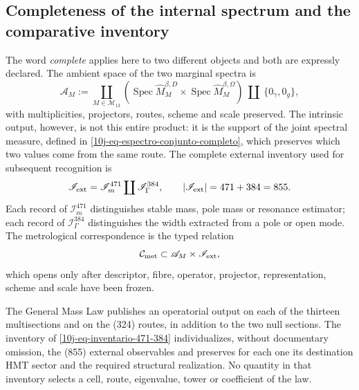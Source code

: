 \subsection{Completeness of the internal spectrum and the comparative inventory}

The word \emph{complete} applies here to two different objects and both are expressly declared. The ambient space of the two marginal spectra is
\begin{equation}
 \mathscr A_M:=
 \coprod_{M\in\mathcal M_{13}}
 \left(
  \operatorname{Spec}\widehat M_M^{\beta,D}
  \times
  \operatorname{Spec}\widehat M_M^{\beta,\Omega}
 \right)
 \ \coprod\ \{0_\gamma,0_g\},
 \label{10j-eq-espectro-interno-completo}
\end{equation}
with multiplicities, projectors, routes, scheme and scale preserved. The intrinsic output, however, is not this entire product: it is the support of the joint spectral measure, defined in \eqref{10j-eq-espectro-conjunto-completo}, which preserves which two values come from the same route. The complete external inventory used for subsequent recognition is
\begin{equation}
 \mathscr I_{\rm ext}
 =\mathscr I_m^{471}\coprod\mathscr I_\Gamma^{384},
 \qquad |\mathscr I_{\rm ext}|=471+384=855.
 \label{10j-eq-inventario-471-384}
\end{equation}
Each record of \(\mathscr I_m^{471}\) distinguishes stable mass, pole mass or resonance estimator; each record of \(\mathscr I_\Gamma^{384}\) distinguishes the width extracted from a pole or open mode. The metrological correspondence is the typed relation
\begin{equation}
 \mathcal C_{\rm met}
 \subset
 \mathscr A_M\times\mathscr I_{\rm ext},
 \label{10j-eq-correspondencia-metrologica-completa}
\end{equation}
which opens only after descriptor, fibre, operator, projector, representation, scheme and scale have been frozen.

\begin{theorem}
\label{10j-thm-doble-completitud}
The General Mass Law publishes an operatorial output on each of the thirteen multisections and on the (324) routes, in addition to the two null sections. The inventory of \eqref{10j-eq-inventario-471-384} individualizes, without documentary omission, the (855) external observables and preserves for each one its destination HMT sector and the required structural realization. No quantity in that inventory selects a cell, route, eigenvalue, tower or coefficient of the law.
\end{theorem}

